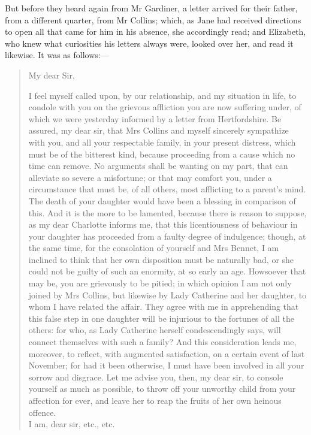 But before they heard again from Mr Gardiner, a letter arrived for their father, from a different quarter, from Mr Collins; which, as Jane had received directions to open all that came for him in his absence, she accordingly read; and Elizabeth, who knew what curiosities his letters always were, looked over her, and read it likewise. It was as follows:—

\begin{quotation}

\noindent My dear Sir,

\indent I feel myself called upon, by our relationship, and my situation in life, to condole with you on the grievous affliction you are now suffering under, of which we were yesterday informed by a letter from Hertfordshire. Be assured, my dear sir, that Mrs Collins and myself sincerely sympathize with you, and all your respectable family, in your present distress, which must be of the bitterest kind, because proceeding from a cause which no time can remove. No arguments shall be wanting on my part, that can alleviate so severe a misfortune; or that may comfort you, under a circumstance that must be, of all others, most afflicting to a parent's mind. The death of your daughter would have been a blessing in comparison of this. And it is the more to be lamented, because there is reason to suppose, as my dear Charlotte informs me, that this licentiousness of behaviour in your daughter has proceeded from a faulty degree of indulgence; though, at the same time, for the consolation of yourself and Mrs Bennet, I am inclined to think that her own disposition must be naturally bad, or she could not be guilty of such an enormity, at so early an age. Howsoever that may be, you are grievously to be pitied; in which opinion I am not only joined by Mrs Collins, but likewise by Lady Catherine and her daughter, to whom I have related the affair. They agree with me in apprehending that this false step in one daughter will be injurious to the fortunes of all the others: for who, as Lady Catherine herself condescendingly says, will connect themselves with such a family? And this consideration leads me, moreover, to reflect, with augmented satisfaction, on a certain event of last November; for had it been otherwise, I must have been involved in all your sorrow and disgrace. Let me advise you, then, my dear sir, to console yourself as much as possible, to throw off your unworthy child from your affection for ever, and leave her to reap the fruits of her own heinous offence.\\

I am, dear sir, etc., etc.
~\\
\end{quotation}

